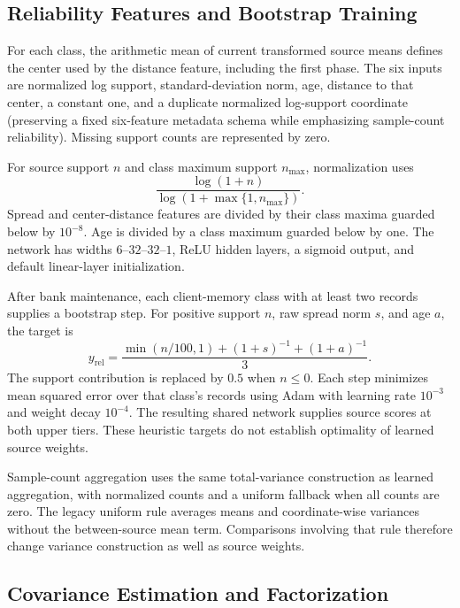 \subsection{Reliability Features and Bootstrap Training}

For each class, the arithmetic mean of current transformed source means defines the center used by the distance feature, including the first phase. The six inputs are normalized log support, standard-deviation norm, age, distance to that center, a constant one, and a duplicate normalized log-support coordinate (preserving a fixed six-feature metadata schema while emphasizing sample-count reliability). Missing support counts are represented by zero.

For source support $n$ and class maximum support $n_{\max}$, normalization uses
\begin{equation}
 \frac{\log(1+n)}
 {\log(1+\max\{1,n_{\max}\})}.
\label{eq:supp_support_normalization}
\end{equation}
Spread and center-distance features are divided by their class maxima guarded below by $10^{-8}$. Age is divided by a class maximum guarded below by one. The network has widths $6$--$32$--$32$--$1$, ReLU hidden layers, a sigmoid output, and default linear-layer initialization.

After bank maintenance, each client-memory class with at least two records supplies a bootstrap step. For positive support $n$, raw spread norm $s$, and age $a$, the target is
\begin{equation}
 y_{\mathrm{rel}}
 =\frac{\min(n/100,1)+(1+s)^{-1}+(1+a)^{-1}}{3}.
\label{eq:supp_reliability_target}
\end{equation}
The support contribution is replaced by $0.5$ when $n\le0$. Each step minimizes mean squared error over that class's records using Adam with learning rate $10^{-3}$ and weight decay $10^{-4}$. The resulting shared network supplies source scores at both upper tiers. These heuristic targets do not establish optimality of learned source weights.

Sample-count aggregation uses the same total-variance construction as learned aggregation, with normalized counts and a uniform fallback when all counts are zero. The legacy uniform rule averages means and coordinate-wise variances without the between-source mean term. Comparisons involving that rule therefore change variance construction as well as source weights.

\subsection{Covariance Estimation and Factorization}

